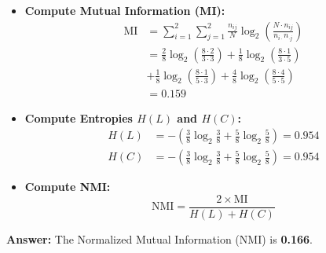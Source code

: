 \documentclass{article}
\begin{document}
\begin{enumerate}[label=(\roman*)]
\begin{itemize}
        \item \textbf{Compute Mutual Information (MI):}
        \[
        \begin{split}
            \text{MI} &= \sum_{i=1}^{2} \sum_{j=1}^{2} \frac{n_{ij}}{N} \log_2 \left( \frac{N \cdot n_{ij}}{n_{i\cdot} n_{\cdot j}} \right) \\
            &= \frac{2}{8} \log_2 \left( \frac{8 \cdot 2}{3 \cdot 3} \right) + \frac{1}{8} \log_2 \left( \frac{8 \cdot 1}{3 \cdot 5} \right) \\
            &+ \frac{1}{8} \log_2 \left( \frac{8 \cdot 1}{5 \cdot 3} \right) + \frac{4}{8} \log_2 \left( \frac{8 \cdot 4}{5 \cdot 5} \right) \\
            &= 0.159
        \end{split}
        \]
        \item \textbf{Compute Entropies $H(L)$ and $H(C)$:}
        \[
        \begin{split}
            H(L) &= -\left( \frac{3}{8} \log_2 \frac{3}{8} + \frac{5}{8} \log_2 \frac{5}{8} \right) = 0.954 \\
            H(C) &= -\left( \frac{3}{8} \log_2 \frac{3}{8} + \frac{5}{8} \log_2 \frac{5}{8} \right) = 0.954
        \end{split}
        \]
        \item \textbf{Compute NMI:}
        \[
        \text{NMI} = \frac{2 \times \text{MI}}{H(L) + H(C)}
        \]
    \end{itemize}

    \textbf{Answer:} The Normalized Mutual Information (NMI) is \textbf{0.166}.

\end{enumerate}
\end{document}
